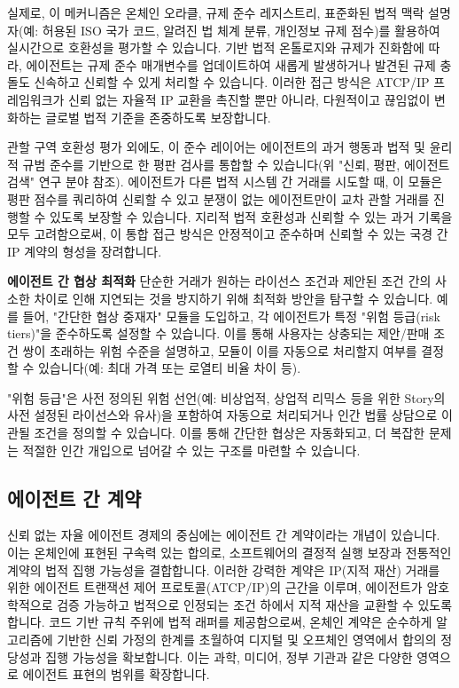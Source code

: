 \documentclass[journal,onecolumn]{IEEEtran} %
\begin{document}
실제로, 이 메커니즘은 온체인 오라클, 규제 준수 레지스트리, 표준화된 법적 맥락 설명자(예: 허용된 ISO 국가 코드, 알려진 법 체계 분류, 개인정보 규제 점수)를 활용하여 실시간으로 호환성을 평가할 수 있습니다. 기반 법적 온톨로지와 규제가 진화함에 따라, 에이전트는 규제 준수 매개변수를 업데이트하여 새롭게 발생하거나 발견된 규제 충돌도 신속하고 신뢰할 수 있게 처리할 수 있습니다. 이러한 접근 방식은 ATCP/IP 프레임워크가 신뢰 없는 자율적 IP 교환을 촉진할 뿐만 아니라, 다원적이고 끊임없이 변화하는 글로벌 법적 기준을 존중하도록 보장합니다.

관할 구역 호환성 평가 외에도, 이 준수 레이어는 에이전트의 과거 행동과 법적 및 윤리적 규범 준수를 기반으로 한 평판 검사를 통합할 수 있습니다(위 "신뢰, 평판, 에이전트 검색" 연구 분야 참조). 에이전트가 다른 법적 시스템 간 거래를 시도할 때, 이 모듈은 평판 점수를 쿼리하여 신뢰할 수 있고 분쟁이 없는 에이전트만이 교차 관할 거래를 진행할 수 있도록 보장할 수 있습니다. 지리적 법적 호환성과 신뢰할 수 있는 과거 기록을 모두 고려함으로써, 이 통합 접근 방식은 안정적이고 준수하며 신뢰할 수 있는 국경 간 IP 계약의 형성을 장려합니다.


\noindent\textbf{에이전트 간 협상 최적화}
단순한 거래가 원하는 라이선스 조건과 제안된 조건 간의 사소한 차이로 인해 지연되는 것을 방지하기 위해 최적화 방안을 탐구할 수 있습니다. 예를 들어, "간단한 협상 중재자" 모듈\cite{ref13}을 도입하고, 각 에이전트가 특정 "위험 등급(risk tiers)"을 준수하도록 설정할 수 있습니다. 이를 통해 사용자는 상충되는 제안/판매 조건 쌍이 초래하는 위험 수준을 설명하고, 모듈이 이를 자동으로 처리할지 여부를 결정할 수 있습니다(예: 최대 가격 또는 로열티 비율 차이 등).

"위험 등급"은 사전 정의된 위험 선언(예: 비상업적, 상업적 리믹스 등을 위한 Story의 사전 설정된 라이선스와 유사)을 포함하여 자동으로 처리되거나 인간 법률 상담으로 이관될 조건을 정의할 수 있습니다. 이를 통해 간단한 협상은 자동화되고, 더 복잡한 문제는 적절한 인간 개입으로 넘어갈 수 있는 구조를 마련할 수 있습니다.


\subsection{에이전트 간 계약}

신뢰 없는 자율 에이전트 경제의 중심에는 에이전트 간 계약이라는 개념이 있습니다. 이는 온체인에 표현된 구속력 있는 합의로, 소프트웨어의 결정적 실행 보장과 전통적인 계약의 법적 집행 가능성을 결합합니다. 이러한 강력한 계약은 IP(지적 재산) 거래를 위한 에이전트 트랜잭션 제어 프로토콜(ATCP/IP)의 근간을 이루며, 에이전트가 암호학적으로 검증 가능하고 법적으로 인정되는 조건 하에서 지적 재산을 교환할 수 있도록 합니다. 코드 기반 규칙 주위에 법적 래퍼를 제공함으로써, 온체인 계약은 순수하게 알고리즘에 기반한 신뢰 가정의 한계를 초월하여 디지털 및 오프체인 영역에서 합의의 정당성과 집행 가능성을 확보합니다. 이는 과학, 미디어, 정부 기관과 같은 다양한 영역으로 에이전트 표현의 범위를 확장합니다.
\end{document}
